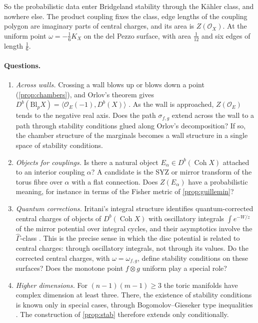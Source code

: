 \documentclass[11pt]{article}
\theoremstyle{definition}
\theoremstyle{remark}
\begin{document}
So the probabilistic data enter Bridgeland stability through the Kähler class, and nowhere else. The
product coupling fixes the class, edge lengths of the coupling polygon are imaginary parts of central
charges, and its area is $Z(\mathcal O_X)$. At the uniform point $\omega=-\tfrac16K_X$ on the del Pezzo
surface, with area $\tfrac1{12}$ and six edges of length $\tfrac16$.

\paragraph{Questions.}
\begin{enumerate}[label=(Q\arabic*),leftmargin=*]
\item \emph{Across walls.} Crossing a wall blows up or blows down a point
  (\cref{prop:chambers}), and Orlov's theorem gives
  $D^b(\mathrm{Bl}_pX)=\langle\mathcal O_E(-1),D^b(X)\rangle$ \cite{Orlov1992}. As the wall is approached,
  $Z(\mathcal O_E)$ tends to the negative real axis. Does the path $\sigma_{f,g}$ extend across the wall to
  a path through stability conditions glued along Orlov's decomposition? If so, the chamber structure of
  the marginals becomes a wall structure in a single space of stability conditions.
\item \emph{Objects for couplings.} Is there a natural object $E_\alpha\in D^b(\operatorname{Coh}X)$ attached to
  an interior coupling $\alpha$? A candidate is the SYZ or mirror transform of the torus fibre over
  $\alpha$ with a flat connection. Does $Z(E_\alpha)$ have a probabilistic meaning, for instance in terms of
  the Fisher metric of \cref{prop:guillemin}?
\item \emph{Quantum corrections.} Iritani's integral structure identifies quantum-corrected central
  charges of objects of $D^b(\operatorname{Coh}X)$ with oscillatory integrals $\int e^{-W/z}$ of the
  mirror potential over integral cycles, and their asymptotics involve the $\widehat\Gamma$-class
  \cite{Iritani2009,GGI2016}. This is the precise sense in which the disc potential is related to
  central charges: through oscillatory integrals, not through its values. Do the corrected central
  charges, with $\omega=\omega_{f,g}$, define stability conditions on these surfaces? Does the monotone
  point $f\otimes g$ uniform play a special role?
\item \emph{Higher dimensions.} For $(n-1)(m-1)\ge3$ the toric manifolds have complex dimension at least
  three. There, the existence of stability conditions is known only in special cases, through
  Bogomolov--Gieseker type inequalities \cite{BMT2014}. The construction of \cref{prop:stab} therefore
  extends only conditionally.
\end{enumerate}
\end{document}
